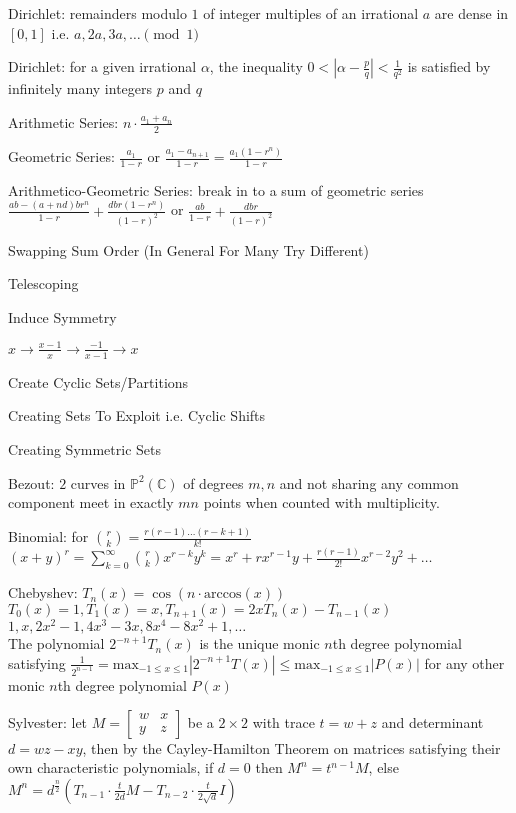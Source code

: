Dirichlet: remainders modulo $1$ of integer multiples of an irrational $a$ are dense in $[0,1]$ i.e. $a,2a,3a,\dots \pmod{1}$

Dirichlet: for a given irrational $\alpha$, the inequality $0<\left|\alpha-\frac{p}{q} \right|<\frac{1}{q^2}$ is satisfied by infinitely many integers $p$ and $q$

Arithmetic Series: $n \cdot \frac{a_1 + a_n}{2}$

Geometric Series: $\frac{a_1}{1-r}$ or $\frac{a_1 - a_{n+1}}{1-r}=\frac{a_1 (1-r^n)}{1-r}$

Arithmetico-Geometric Series: break in to a sum of geometric series $\frac{ab-(a+nd)br^n}{1-r}+\frac{dbr(1-r^n)}{(1-r)^2}$ or $\frac{ab}{1-r}+\frac{dbr}{(1-r)^2}$

Swapping Sum Order (In General For Many Try Different)

Telescoping

Induce Symmetry

$x \to \frac{x-1}{x} \to \frac{-1}{x-1} \to x$

Create Cyclic Sets/Partitions

Creating Sets To Exploit i.e. Cyclic Shifts

Creating Symmetric Sets

Bezout: $2$ curves in $\mathbb{P}^2(\mathbb{C})$ of degrees $m,n$ and not sharing any common component meet in exactly $mn$ points when counted with multiplicity.

Binomial: for $\binom{r}{k}=\frac{r(r-1)\dots (r-k+1)}{k!}$ \\
$(x+y)^r=\sum_{k=0}^{\infty}\binom{r}{k}x^{r-k}y^k=x^r+rx^{r-1}y+\frac{r(r-1)}{2!}x^{r-2}y^2+\dots$

Chebyshev: $T_n (x)=\cos(n\cdot \text{arccos}(x))$ \\
$T_0 (x)=1,T_1(x)=x,T_{n+1}(x)=2xT_n(x)-T_{n-1}(x)$ \\
$1,x,2x^2-1,4x^3-3x,8x^4-8x^2+1,\dots$ \\
The polynomial $2^{-n+1}T_n(x)$ is the unique monic $n$th degree polynomial satisfying $\frac{1}{2^{n-1}} = \text{max}_{-1 \le x \le 1}|2^{-n+1}T(x)| \le \text{max}_{-1 \le x \le 1}|P(x)|$ for any other monic $n$th degree polynomial $P(x)$

Sylvester: let $M=\begin{bmatrix}w & x \\ y & z \end{bmatrix}$ be a $2\times 2$ with trace $t=w+z$ and determinant $d=wz-xy$, then by the Cayley-Hamilton Theorem on matrices satisfying their own characteristic polynomials, if $d=0$ then $M^n=t^{n-1}M$, else $M^n=d^{\frac{n}{2}}\left(T_{n-1}\cdot \frac{t}{2d} M-T_{n-2}\cdot \frac{t}{2\sqrt{d}}I \right)$

